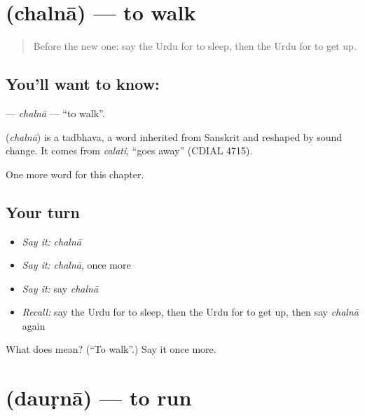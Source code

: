 \section[\texorpdfstring{\ur{چلنا} (chalnā)}{چلنا (chalnā)}]{ (chalnā) — to walk}

\label{lesson:UR-C47-chalna}



\begin{quote}
Before the new one: say the Urdu for to sleep, then the Urdu for to get up.
\end{quote}

\subsection*{You'll want to know: }
\textbf{} — \emph{chalnā} — \textquotedblleft{}to walk\textquotedblright{}.

\begin{cousinweb}
\textbf{} (\emph{chalnā}) is a tadbhava, a word inherited from Sanskrit and reshaped by sound change. It comes from \emph{calati}, \textquotedblleft{}goes away\textquotedblright{} (CDIAL 4715).
\end{cousinweb}

\begin{grammarlens}[title={What you've built}]
One more word for this chapter.
\end{grammarlens}

\subsection*{Your turn}
\begin{itemize}
\raggedright
  \item \emph{Say it:} \emph{chalnā}
  \item \emph{Say it:} \emph{chalnā}, once more
  \item \emph{Say it:} say \emph{chalnā}
  \item \emph{Recall:} say the Urdu for to sleep, then the Urdu for to get up, then say \emph{chalnā} again
\end{itemize}

\begin{tcolorbox}[breakable,colback=teal!4,colframe=teal!35!black,title={Before you move on}]
What does  mean? (\textquotedblleft{}To walk\textquotedblright{}.) Say it once more.
\end{tcolorbox}
\section[\texorpdfstring{\ur{دوڑنا} (dauṛnā)}{دوڑنا (dauṛnā)}]{ (dauṛnā) — to run}

